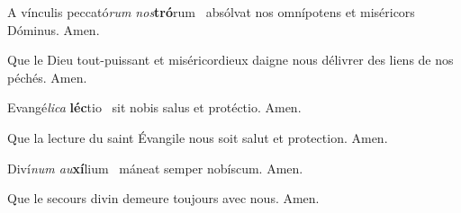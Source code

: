 \documentclass[psautier_nocturne_fr.tex]{subfiles}
\begin{document}



\begin{paracol}{2}

A vínculis peccató\textit{rum nos}\textbf{tró}rum~\GreSpecial{*}
absólvat nos omnípotens et miséricors Dóminus.
\hspace{\specialcharhsep}\rr Amen.

\switchcolumn

Que le Dieu tout-puissant et miséricordieux daigne nous délivrer des liens de nos péchés.
\hspace{\specialcharhsep}\rr Amen.

\end{paracol}


\begin{paracol}{2}

Evangé\textit{lica} \textbf{léc}tio~\GreSpecial{*}
sit nobis salus et protéctio.
\hspace{\specialcharhsep}\rr Amen.

\switchcolumn

Que la lecture du saint Évangile nous soit salut et protection.
\hspace{\specialcharhsep}\rr Amen.

\end{paracol}


\begin{paracol}{2}

Diví\textit{num au}\textbf{xí}lium~\GreSpecial{*}
máneat semper nobíscum.
\hspace{\specialcharhsep}\rr Amen.

\switchcolumn

Que le secours divin demeure toujours avec nous.
\hspace{\specialcharhsep}\rr Amen.

\end{paracol}

\pagebreak

\end{document}
